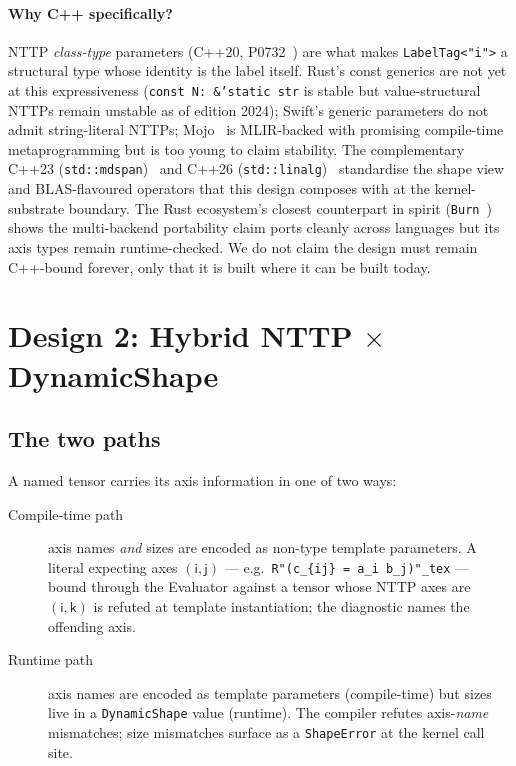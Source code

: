 \documentclass[10pt,twocolumn]{article}
\newcommand{\ax}[1]{\textsf{#1}}                              %
\newcommand{\code}[1]{\texttt{#1}}
\begin{document}
\paragraph{Why C++ specifically?}
NTTP \emph{class-type} parameters (C++20, P0732~\cite{cpp20-p0732})
are what makes \code{LabelTag<"i">} a structural type whose identity
is the label itself. Rust's const generics are not yet at this
expressiveness (\code{const N: \&'static str} is stable but
value-structural NTTPs remain unstable as of edition 2024); Swift's
generic parameters do not admit string-literal NTTPs;
Mojo~\cite{modular2024mojo} is MLIR-backed with promising
compile-time metaprogramming but is too young to claim stability.
The complementary C++23 (\code{std::mdspan})~\cite{cpp23-mdspan} and
C++26 (\code{std::linalg})~\cite{cpp26-stdlinalg} standardise the
shape view and BLAS-flavoured operators that this design composes
with at the kernel-substrate boundary. The Rust ecosystem's closest
counterpart in spirit (\code{Burn}~\cite{burn2024rust}) shows the
multi-backend portability claim ports cleanly across languages but
its axis types remain runtime-checked. We do not claim the design
must remain C++-bound forever, only that it is built where it can
be built today.

\section{Design 2: Hybrid NTTP $\times$ DynamicShape}
\label{sec:hybrid}


\subsection{The two paths}

A named tensor carries its axis information in one of two ways:

\begin{description}
  \item[Compile-time path] axis names \emph{and} sizes are encoded as
        non-type template parameters. A literal expecting axes
        $(\ax{i},\ax{j})$ --- e.g.\
        \code{R"(c\_\{ij\} = a\_i b\_j)"\_tex} --- bound through the
        Evaluator against a tensor whose NTTP axes are
        $(\ax{i},\ax{k})$ is refuted at template instantiation; the
        diagnostic names the offending axis.
  \item[Runtime path] axis names are encoded as template parameters
        (compile-time) but sizes live in a \code{DynamicShape} value
        (runtime). The compiler refutes axis-\emph{name} mismatches;
        size mismatches surface as a \code{ShapeError} at the kernel
        call site.
\end{description}
\end{document}
